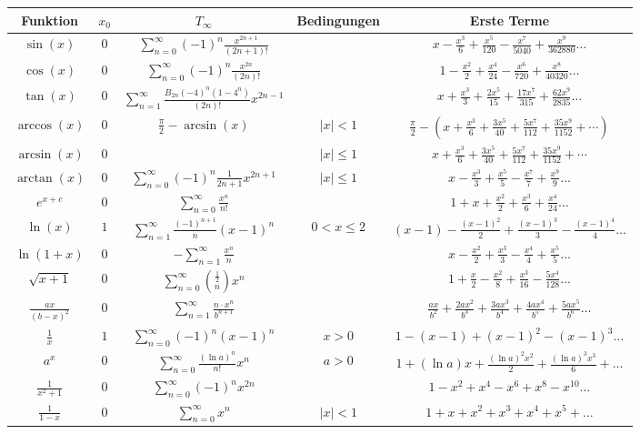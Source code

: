 \begin{tabular}{|c|c|c|c|c|}
  \hline
  Funktion & $x_0$ & $T_{\infty}$ & Bedingungen & Erste Terme \\
  \hline
  $\sin(x)$ & $0$ & $\sum_{n=0}^{\infty}(-1)^n \frac{x^{2n+1}}{(2n+1)!}$ & & $x - \frac{x^3}{6} + \frac{x^5}{120} - \frac{x^7}{5040} + \frac{x^9}{362880} \ldots$ \\
  \hline
  $\cos(x)$ & $0$ & $\sum_{n=0}^{\infty}(-1)^n \frac{x^{2n}}{(2n)!}$ & & $1 - \frac{x^2}{2} + \frac{x^4}{24} - \frac{x^6}{720} + \frac{x^8}{40320} \ldots$ \\
  \hline
  $\tan(x)$ & $0$ & $\sum_{n=1}^{\infty} \frac{B_{2 n}(-4)^n\left(1-4^n\right)}{(2 n) !} x^{2 n-1}$ & & $x + \frac{x^3}{3} + \frac{2x^5}{15} + \frac{17x^7}{315} + \frac{62x^9}{2835} \ldots$ \\
  \hline
  $\arccos(x)$ & $0$ & $\frac{\pi}{2} - \arcsin(x)$ & $|x|<1$ & $\frac{\pi}{2}-\left(x+\frac{x^3}{6}+\frac{3 x^5}{40}+\frac{5 x^7}{112}+\frac{35 x^9}{1152}+\cdots\right)$ \\
  \hline
  $\arcsin(x)$ & $0$ &  & $|x|\leq1$ & $x+\frac{x^3}{6}+\frac{3 x^5}{40}+\frac{5 x^7}{112}+\frac{35 x^9}{1152}+\cdots$ \\
  \hline
  $\arctan(x)$ & $0$ & $\sum_{n=0}^{\infty}(-1)^n \frac{1}{2n+1} x^{2n+1}$ & $|x|\leq1$ & $x - \frac{x^3}{3} + \frac{x^5}{5} - \frac{x^7}{7} + \frac{x^9}{9} \ldots$ \\
  \hline
  $e^{x+c}$ & $0$ & $\sum_{n=0}^{\infty} \frac{x^n}{n!}$ & & $1 + x + \frac{x^2}{2} + \frac{x^3}{6} + \frac{x^4}{24} \ldots$ \\
  \hline
  $\ln(x)$ & $1$ & $\sum_{n=1}^\infty \frac{(-1)^{n+1}}{n}(x-1)^n$ & $0 < x \leq 2$ & $(x-1) - \frac{(x-1)^2}{2} + \frac{(x-1)^3}{3} - \frac{(x-1)^4}{4} \ldots$ \\
  \hline
  $\ln(1+x)$ & $0$ & $-\sum_{n=1}^{\infty} \frac{x^n}{n}$ & & $x - \frac{x^2}{2} + \frac{x^3}{3} - \frac{x^4}{4} + \frac{x^5}{5} \ldots$ \\
  \hline
  $\sqrt{x+1}$ & $0$ & $\sum_{n=0}^{\infty} \binom{\frac{1}{2}}{n} x^n$ & & $1 + \frac{x}{2} - \frac{x^2}{8} + \frac{x^3}{16} - \frac{5x^4}{128} \ldots$ \\
  \hline
  $\frac{ax}{(b-x)^2}$ & $0$ & $\sum_{n=1}^{\infty} \frac{n \cdot x^n }{b^{n+1}}$ & & $\frac{ax}{b^2} + \frac{2ax^2}{b^3} + \frac{3ax^3}{b^4} + \frac{4ax^4}{b^5} + \frac{5ax^5}{b^6} \ldots$ \\
  \hline
  $\frac{1}{x}$ & $1$ & $\sum_{n=0}^{\infty} (-1)^n (x-1)^n$ & $x > 0$ & $1 - (x-1) + (x-1)^2 - (x-1)^3\ldots$ \\
  \hline
  $a^x$ & $0$ & $\sum_{n=0}^{\infty} \frac{(\ln a)^n}{n!} x^n$ & $a > 0$ & $1 + (\ln a)x + \frac{(\ln a)^2 x^2}{2} + \frac{(\ln a)^3 x^3}{6} + \ldots$ \\
  \hline
  $\frac{1}{x^2+1}$ & $0$ & $\sum_{n=0}^\infty (-1)^n x^{2n}$ & & $1 - x^2 + x^4 - x^6 + x^8 - x^{10} \ldots$ \\
  \hline
  $\frac{1}{1-x}$ & $0$ & $\sum_{n=0}^{\infty} x^n$ & $|x| < 1$ & $1 + x + x^2 + x^3 + x^4 + x^5 + \ldots$ \\
  \hline
\end{tabular}

